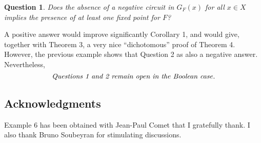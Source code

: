 \documentclass[11pt]{article}
\newtheorem{question}{Question}
\begin{document}
\begin{question}
Does the absence of a negative circuit in $G_F(x)$ for all $x\in X$
implies the presence of at least one fixed point for $F$?
\end{question}
A positive answer would improve significantly Corollary 1, and would
give, together with Theorem 3, a very nice ``dichotomous'' proof of
Theorem 4. However, the previous example shows that Question 2 as also
a negative answer. Nevertheless,
\[
\textrm{{\emph{Questions 1 and 2 remain open in
the Boolean case}}}.
\]

{\subsection*{Acknowledgments}}


\noindent
Example 6 has been obtained with Jean-Paul Comet that I gratefully
thank. I also thank Bruno Soubeyran for stimulating discussions.
\end{document}
